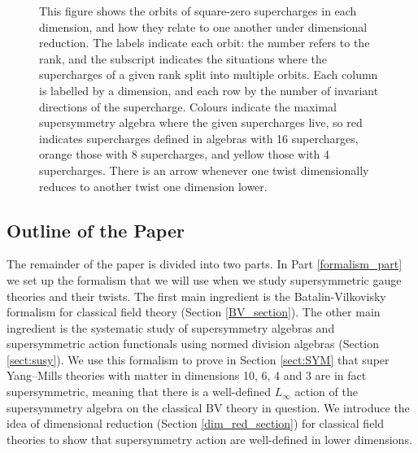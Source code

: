 \documentclass[10pt, oneside]{article}
\begin{document}
\begin{figure}[hbp]
\caption{This figure shows the orbits of square-zero supercharges in each dimension, and how they relate to one another under dimensional reduction.  The labels indicate each orbit: the number refers to the rank, and the subscript indicates the situations where the supercharges of a given rank split into multiple orbits.  Each column is labelled by a dimension, and each row by the number of invariant directions of the supercharge.  Colours indicate the maximal supersymmetry algebra where the given supercharges live, so red indicates supercharges defined in algebras with 16 supercharges, orange those with 8 supercharges, and yellow those with 4 supercharges.  There is an arrow whenever one twist dimensionally reduces to another twist one dimension lower.}
\label{fig:superchargeorbits}
\end{figure}

\subsection*{Outline of the Paper}
The remainder of the paper is divided into two parts.  In Part \ref{formalism_part} we set up the formalism that we will use when we study supersymmetric gauge theories and their twists.  The first main ingredient is the Batalin-Vilkovisky formalism for classical field theory (Section \ref{BV_section}).
The other main ingredient is the systematic study of supersymmetry algebras and supersymmetric action functionals using normed division algebras (Section \ref{sect:susy}).
We use this formalism to prove in Section \ref{sect:SYM} that super Yang--Mills theories with matter in dimensions 10, 6, 4 and 3 are in fact supersymmetric, meaning that there is a well-defined $L_\infty$ action of the supersymmetry algebra on the classical BV theory in question.  We introduce the idea of dimensional reduction (Section \ref{dim_red_section}) for classical field theories to show that supersymmetry action are well-defined in lower dimensions.
\end{document}
